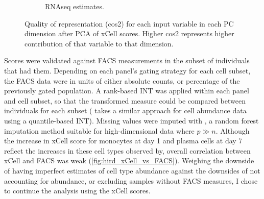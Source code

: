 \begin{figure}
\begin{subfigure}[b]{0.6\textwidth}
        \caption{\gls{RNAseq} estimates.}
    \end{subfigure}
    \caption{Quality of representation (cos2) for each input variable in each \gls{PC} dimension after \gls{PCA} of xCell scores. Higher cos2 represents higher contribution of that variable to that dimension.}
    \label{fig:hird_xCell_cos2}
\end{figure}

Scores were validated against \gls{FACS} measurements in the subset of individuals that had them.
Depending on each panel's gating strategy for each cell subset, the \gls{FACS} data were in units of either absolute counts, or percentage of the previously gated population.
A rank-based \gls{INT} was applied within each panel and cell subset, so that the transformed measure could be compared between individuals for each subset (\autocite{astle2016AllelicLandscapeHuman} takes a similar approach for cell abundance data using a quantile-based \gls{INT}).
%
Missing values were imputed with , a random forest imputation method suitable for high-dimensional data where $p \gg n$.
Although the increase in xCell score for monocytes at day 1 and plasma cells at day 7 reflect the increases in these cell types observed by\autocite{sobolev2016AdjuvantedInfluenzaH1N1Vaccination}, overall correlation between xCell and \gls{FACS} was weak (\cref{fig:hird_xCell_vs_FACS}).
Weighing the downside of having imperfect estimates of cell type abundance against the downsides of not accounting for abundance, or excluding samples without \gls{FACS} measures, I chose to continue the analysis using the xCell scores.

